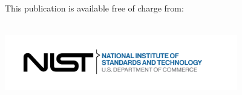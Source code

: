 \begin{titlepage}
\begin{flushright}
\tagmcend %
 \tagstructend %
\tagpdfparaOn 
\vfill
\large \authorone\\
\large \authortwo\\
\large \authorthree\\
\large \authorfour\\
\large \authorfive\\
\large \authorsix\\
\large \authorseven\\
\large \authoreight\\
\large \authornine\\
\vfill
\normalsize This publication is available free of charge from:\\
\DOI\\
\vfill
 \tagpdfparaOff {}%
%

\includegraphics[trim=0 0 0.7in 0,clip,width=4in]{NIST-logo.png}\\ 

  \tagmcend
 \tagstructend
 
\end{flushright}
\end{titlepage}
